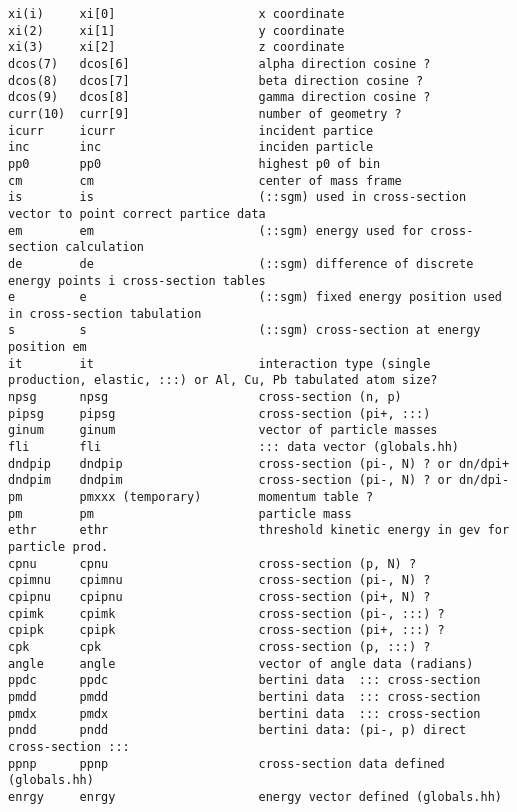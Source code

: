 \begin{verbatim}
xi(i)     xi[0]                    x coordinate
xi(2)     xi[1]                    y coordinate
xi(3)     xi[2]                    z coordinate
dcos(7)   dcos[6]                  alpha direction cosine ?
dcos(8)   dcos[7]                  beta direction cosine ?
dcos(9)   dcos[8]                  gamma direction cosine ?
curr(10)  curr[9]                  number of geometry ?
icurr     icurr                    incident partice
inc       inc                      inciden particle    
pp0       pp0                      highest p0 of bin 
cm        cm                       center of mass frame
is        is                       (::sgm) used in cross-section vector to point correct partice data
em        em                       (::sgm) energy used for cross-section calculation
de        de                       (::sgm) difference of discrete energy points i cross-section tables 
e         e                        (::sgm) fixed energy position used in cross-section tabulation
s         s                        (::sgm) cross-section at energy position em
it        it                       interaction type (single production, elastic, :::) or Al, Cu, Pb tabulated atom size? 
npsg      npsg                     cross-section (n, p)
pipsg     pipsg                    cross-section (pi+, :::) 
ginum     ginum                    vector of particle masses
fli       fli                      ::: data vector (globals.hh)
dndpip    dndpip                   cross-section (pi-, N) ? or dn/dpi+
dndpim    dndpim                   cross-section (pi-, N) ? or dn/dpi-
pm        pmxxx (temporary)        momentum table ?           
pm        pm                       particle mass
ethr      ethr                     threshold kinetic energy in gev for particle prod.  
cpnu      cpnu                     cross-section (p, N) ?
cpimnu    cpimnu                   cross-section (pi-, N) ?
cpipnu    cpipnu                   cross-section (pi+, N) ?
cpimk     cpimk                    cross-section (pi-, :::) ?
cpipk     cpipk                    cross-section (pi+, :::) ?
cpk       cpk                      cross-section (p, :::) ?
angle     angle                    vector of angle data (radians)
ppdc      ppdc                     bertini data  ::: cross-section
pmdd      pmdd                     bertini data  ::: cross-section
pmdx      pmdx                     bertini data  ::: cross-section
pndd      pndd                     bertini data: (pi-, p) direct cross-section :::
ppnp      ppnp                     cross-section data defined (globals.hh)
enrgy     enrgy                    energy vector defined (globals.hh)

\end{verbatim}
